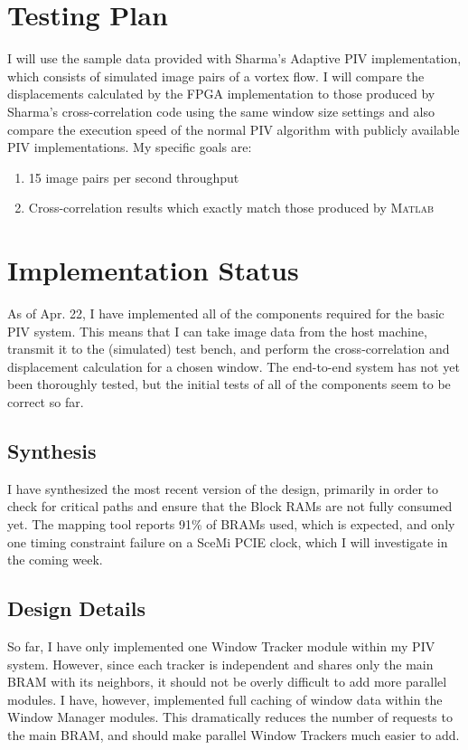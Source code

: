 \documentclass{article}
\begin{document}
\section{Testing Plan}
I will use the sample data provided with Sharma's Adaptive PIV implementation, which consists of simulated image pairs of a vortex flow. I will compare the displacements calculated by the FPGA implementation to those produced by Sharma's cross-correlation code using the same window size settings and also compare the execution speed of the normal PIV algorithm with publicly available PIV implementations. My specific goals are:
\begin{enumerate}
	\item 15 image pairs per second throughput
	\item Cross-correlation results which exactly match those produced by \textsc{Matlab}
\end{enumerate}

\section{Implementation Status}
As of Apr. 22, I have implemented all of the components required for the basic PIV system. This means that I can take image data from the host machine, transmit it to the (simulated) test bench, and perform the cross-correlation and displacement calculation for a chosen window. The end-to-end system has not yet been thoroughly tested, but the initial tests of all of the components seem to be correct so far. 

\subsection{Synthesis}
I have synthesized the most recent version of the design, primarily in order to check for critical paths and ensure that the Block RAMs are not fully consumed yet. The mapping tool reports 91\% of BRAMs used, which is expected, and only one timing constraint failure on a SceMi PCIE clock, which I will investigate in the coming week. 

\subsection{Design Details}
So far, I have only implemented one Window Tracker module within my PIV system. However, since each tracker is independent and shares only the main BRAM with its neighbors, it should not be overly difficult to add more parallel modules. I have, however, implemented full caching of window data within the Window Manager modules. This dramatically reduces the number of requests to the main BRAM, and should make parallel Window Trackers much easier to add.
\end{document}
